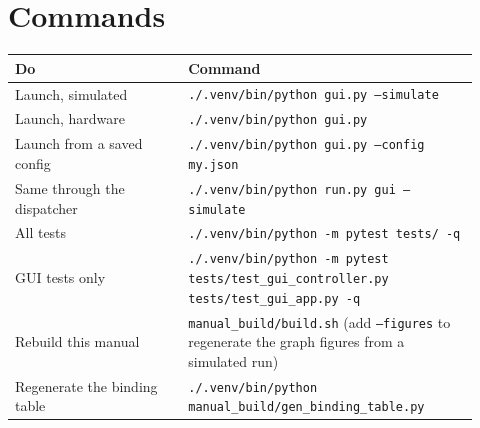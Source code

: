 \section{Commands}

\small\setlength{\LTleft}{0pt}\setlength{\LTright}{\fill}
\begin{longtable}{@{}>{\raggedright\arraybackslash}p{0.34\linewidth}>{\raggedright\arraybackslash}p{0.58\linewidth}@{}}
\toprule
\textbf{Do} & \textbf{Command} \\
\midrule\endhead
Launch, simulated & \texttt{.\discretionary{}{}{}/\discretionary{}{}{}.\discretionary{}{}{}venv/\discretionary{}{}{}bin/\discretionary{}{}{}python gui.\discretionary{}{}{}py --simulate} \\
Launch, hardware & \texttt{.\discretionary{}{}{}/\discretionary{}{}{}.\discretionary{}{}{}venv/\discretionary{}{}{}bin/\discretionary{}{}{}python gui.\discretionary{}{}{}py} \\
Launch from a saved config & \texttt{.\discretionary{}{}{}/\discretionary{}{}{}.\discretionary{}{}{}venv/\discretionary{}{}{}bin/\discretionary{}{}{}python gui.\discretionary{}{}{}py --config my.\discretionary{}{}{}json} \\
Same through the dispatcher & \texttt{.\discretionary{}{}{}/\discretionary{}{}{}.\discretionary{}{}{}venv/\discretionary{}{}{}bin/\discretionary{}{}{}python run.\discretionary{}{}{}py gui --simulate} \\
All tests & \texttt{.\discretionary{}{}{}/\discretionary{}{}{}.\discretionary{}{}{}venv/\discretionary{}{}{}bin/\discretionary{}{}{}python -m pytest tests/\discretionary{}{}{} -q} \\
GUI tests only & \texttt{.\discretionary{}{}{}/\discretionary{}{}{}.\discretionary{}{}{}venv/\discretionary{}{}{}bin/\discretionary{}{}{}python -m pytest tests/\discretionary{}{}{}test\_\discretionary{}{}{}gui\_\discretionary{}{}{}controller.\discretionary{}{}{}py tests/\discretionary{}{}{}test\_\discretionary{}{}{}gui\_\discretionary{}{}{}app.\discretionary{}{}{}py -q} \\
Rebuild this manual & \texttt{manual\_\discretionary{}{}{}build/\discretionary{}{}{}build.\discretionary{}{}{}sh} (add \texttt{--figures} to regenerate the graph figures from a simulated run) \\
Regenerate the binding table & \texttt{.\discretionary{}{}{}/\discretionary{}{}{}.\discretionary{}{}{}venv/\discretionary{}{}{}bin/\discretionary{}{}{}python manual\_\discretionary{}{}{}build/\discretionary{}{}{}gen\_\discretionary{}{}{}binding\_\discretionary{}{}{}table.\discretionary{}{}{}py} \\
\bottomrule
\end{longtable}
\normalsize

